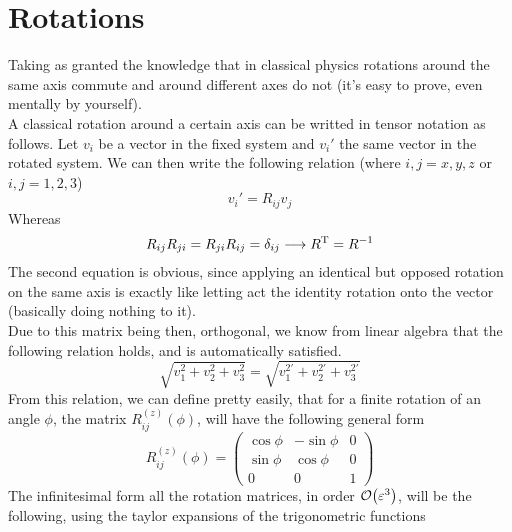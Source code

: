 \documentclass[../qm.tex]{subfiles}
\begin{document}
	\section{Rotations}
	Taking as granted the knowledge that in classical physics rotations around the same axis commute and around different axes do not (it's easy to prove, even mentally by yourself).\\
	A classical rotation around a certain axis can be writted in tensor notation as follows. Let $v_i$ be a vector in the fixed system and $v_i'$ the same vector in the rotated system. We can then write the following relation (where $i,j=x,y,z$ or $i,j=1,2,3$)
	\begin{equation*}
		v_i'=R_{ij}v_j
	\end{equation*}
	Whereas
	\begin{equation*}
		R_{ij}R_{ji}=R_{ji}R_{ij}=\delta_{ij}\longrightarrow R^{\text{T}}=R^{-1}
	\end{equation*}
	The second equation is obvious, since applying an identical but opposed rotation on the same axis is exactly like letting act the identity rotation onto the vector (basically doing nothing to it).\\
	Due to this matrix being then, orthogonal, we know from linear algebra that the following relation holds, and is automatically satisfied.
	\begin{equation*}
		\sqrt{v_1^2+v_2^2+v_3^2}=\sqrt{v_1^{2'}+v_2^{2'}+v_3^{2'}}
	\end{equation*}
	From this relation, we can define pretty easily, that for a finite rotation of an angle $\phi$, the matrix $R_{ij}^{(z)}(\phi)$, will have the following general form
	\begin{equation}
		R_{ij}^{(z)}(\phi)=\begin{pmatrix}
			\cos\phi&-\sin\phi&0\\
			\sin\phi&\cos\phi&0\\
			0&0&1
		\end{pmatrix}
		\label{eq:finiterotmatrix}
	\end{equation}
	The infinitesimal form all the rotation matrices, in order $\order{\varepsilon^3}$, will be the following, using the taylor expansions of the trigonometric functions
\end{document}

